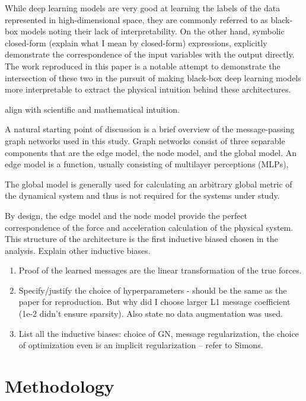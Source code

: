 \documentclass{article}
\begin{document}
While deep learning models are very good at learning the labels of the data represented in high-dimensional space, they are commonly referred to as black-box models noting their lack of interpretability. On the other hand, symbolic closed-form (explain what I mean by closed-form) expressions, explicitly demonstrate the correspondence of the input variables with the output directly. The work reproduced in this paper is a notable attempt to demonstrate the intersection of these two in the pursuit of making black-box deep learning models more interpretable to extract the physical intuition behind these architectures.


align with scientific and mathematical intuition. 

A natural starting point of discussion is a brief overview of the message-passing graph networks used in this study. Graph networks consist of three separable components that are the edge model, the node model, and the global model. An edge model is a function, usually consisting of multilayer perceptions (MLPs), 


The global model is generally used for calculating an arbitrary global metric of the dynamical system and thus is not required for the systems under study. 




By design, the edge model and the node model provide the perfect correspondence of the force and acceleration calculation of the physical system. This structure of the architecture is the first inductive biased chosen in the analysis. Explain other inductive biases.



\begin{enumerate}
    \item Proof of the learned messages are the linear transformation of the true forces.
    \item Specify/justify the choice of hyperparameters - should be the same as the paper for reproduction. But why did I choose larger L1 message coefficient (1e-2 didn't ensure sparsity). Also state no data augmentation was used.
    \item List all the inductive biases: choice of GN, message regularization, the choice of optimization even is an implicit regularization -- refer to Simons. 
\end{enumerate}


\section{Methodology} 
\end{document}
